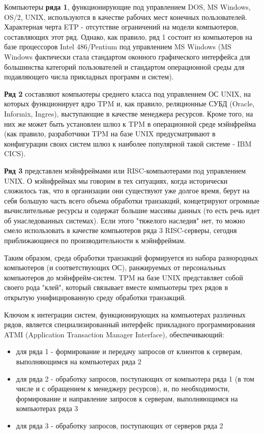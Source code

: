 Компьютеры \textbf{ряда 1}, функционирующие под управлением DOS, MS Windows, OS/2, UNIX, используются в качестве рабочих мест
конечных пользователей. Характерная черта ETP - отсутствие ограничений на модели компьютеров,
составляющих этот ряд. Однако, как правило, ряд 1 состоит из компьютеров на базе процессоров Intel
486/Pentium под управлением MS Windows (MS Windows фактически стала стандартом оконного графического интерфейса
для большинства категорий пользователей и стандартом операционной среды для подавляющего числа прикладных программ и систем).

\textbf{Ряд 2} составляют компьютеры среднего класса под управлением ОС UNIX,
на которых функционирует ядро TPM и, как правило, реляционные СУБД (Oracle, Informix, Ingres),
выступающие в качестве менеджера ресурсов. Кроме того, на них же может быть установлен шлюз к TPM в
операционной среде мэйнфрейма (как правило, разработчики TPM на базе UNIX предусматривают в конфигурации своих
систем шлюз к наиболее популярной такой системе - IBM CICS).

\textbf{Ряд 3} представлен мэйнфреймами или RISC-компьютерами под управлением UNIX. О мэйнфреймах мы
говорим в тех ситуациях, когда исторически сложилось так, что в организации они существуют уже долгое время,
берут на себя большую часть всего объема обработки транзакций, концетрируют огромные вычислительные
ресурсы и содержат большие массивы данных (то есть речь идет об унаследованных системах). Если этого
"тяжелого наследия" нет, то можно смело использовать в качестве компьютеров ряда 3 RISC-серверы,
сегодня приближающиеся по производительности к мэйнфреймам.

Таким образом, среда обработки транзакций формируется из набора разнородных компьютеров (и соответствующих ОС),
ранжируемых от персональных компьютеров до мэйнфрейм-систем. TPM на базе UNIX представляет собой своего
рода "клей", который связывает вместе компьютеры трех рядов в открытую унифицированную среду обработки транзакций.

Ключом к интеграции систем, функционирующих на компьютерах различных рядов, является специализированный
интерфейс прикладного программирования ATMI (Application Transaction Manager Interface), обеспечивающий:
\begin{itemize}
    \item для ряда 1 - формирование и передачу запросов от клиентов к серверам, выполняющимся на компьютерах ряда 2
    \item для ряда 2 - обработку запросов, поступающих от компьютера ряда 1 (в том числе и с
    обращением к менеджеру ресурсов), и, по необходимости, формирование и направление
    запросов к серверам, выполняющимся на компьютерах ряда 3
    \item для ряда 3 - обработку запросов, поступающих от серверов ряда 2
\end{itemize}

